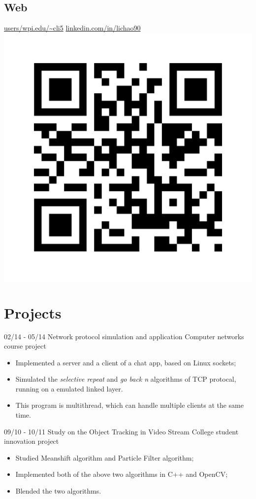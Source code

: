 \documentclass[]{friggeri-cv}
\begin{document}
\begin{aside}
	\section{Web}
	\href{http://users.wpi.edu/~cli5}{users/wpi.edu/\textasciitilde cli5}
	\href{https://www.linkedin.com/in/lichao90}{linkedin.com/in/lichao90}
	\includegraphics[scale=0.05]{img/Chao_Li.png}
\end{aside}

\section{Projects}
\begin{entrylist}
	\entry
	{02/14 - 05/14}
	{Network protocol simulation and application}
	{Computer networks course project}
	{
		\vspace{-3mm}
		\begin{itemize}
			\item Implemented a server and a client of a chat app, based on Linux
				sockets;
			\item Simulated the \emph{selective repeat} and \emph{go back n}
				algorithms of TCP protocal, running on a emulated linked layer.
			\item This program is multithread, which can handle multiple clients at
				the same time.
		\end{itemize}
	}
	\entry
	{09/10 - 10/11}
	{Study on the Object Tracking in Video Stream}
	{College student innovation project}
	{
		\vspace{-3mm}
		\begin{itemize}
			\item Studied Meanshift algorithm and Particle Filter algorithm;
			\item Implemented both of the above two algorithms in C++ and OpenCV;
			\item Blended the two algorithms.
		\end{itemize}
	}
\end{entrylist}
\end{document}
